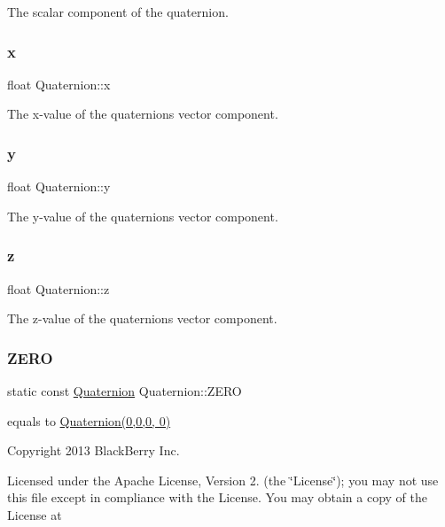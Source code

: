 The scalar component of the quaternion. \mbox{\label{classQuaternion_a8b80f191a3155cc0158d2b4f4d50b2cb}} 
\subsubsection{\texorpdfstring{x}{x}}
{\footnotesize\ttfamily float Quaternion\+::x}

The x-\/value of the quaternion\textquotesingle{}s vector component. \mbox{\label{classQuaternion_a3bd3f270462944423611f44e19d2511b}} 
\subsubsection{\texorpdfstring{y}{y}}
{\footnotesize\ttfamily float Quaternion\+::y}

The y-\/value of the quaternion\textquotesingle{}s vector component. \mbox{\label{classQuaternion_a625cb732d8ff3083e7852b86b736ab29}} 
\subsubsection{\texorpdfstring{z}{z}}
{\footnotesize\ttfamily float Quaternion\+::z}

The z-\/value of the quaternion\textquotesingle{}s vector component. \mbox{\label{classQuaternion_a808de84686edca53817636945082be8b}} 
\subsubsection{\texorpdfstring{Z\+E\+RO}{ZERO}}
{\footnotesize\ttfamily static const \hyperlink{classQuaternion}{Quaternion} Quaternion\+::\+Z\+E\+RO\hspace{0.3cm}{\ttfamily [static]}}

equals to \hyperlink{classQuaternion}{Quaternion(0,0,0, 0)}

Copyright 2013 Black\+Berry Inc.

Licensed under the Apache License, Version 2. (the \char`\"{}\+License\char`\"{}); you may not use this file except in compliance with the License. You may obtain a copy of the License at

